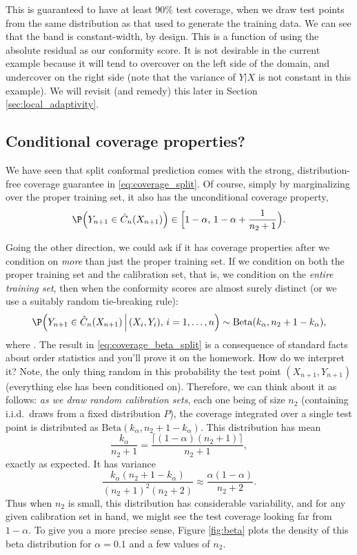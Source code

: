 \documentclass{article}
\begin{document}
This is guaranteed to have at least 90\% test coverage, when we draw test points
from the same distribution as that used to generate the training data. We can
see that the band is constant-width, by design. This is a function of using the
absolute residual as our conformity score. It is not desirable in the current
example because it will tend to overcover on the left side of the domain, and
undercover on the right side (note that the variance of $Y|X$ is not constant in
this example). We will revisit (and remedy) this later in Section
\ref{sec:local_adaptivity}.   

\subsection{Conditional coverage properties?}

We have seen that split conformal prediction comes with the strong,
distribution-free coverage guarantee in \eqref{eq:coverage_split}. Of course, 
simply by marginalizing over the proper training set, it also has the
unconditional coverage property, 
\[
\P\Big( Y_{n+1} \in \hC_n(X_{n+1}) \Big) \in
\Big[ 1-\alpha, \, 1-\alpha + \frac{1}{n_2+1} \Big).  
\]

Going the other direction, we could ask if it has coverage properties after we
condition on \emph{more} than just the proper training set. If we condition on
both the proper training set and the calibration set, that is, we condition on
the \emph{entire training set}, then when the conformity scores are almost 
surely distinct (or we use a suitably random tie-breaking rule): 
\begin{equation}
\label{eq:coverage_beta_split}
\P\Big(Y_{n+1} \in \hC_n(X_{n+1}) \, \Big| \, (X_i,Y_i), \, i=1,\dots,n \Big) 
\sim \mathrm{Beta}(k_\alpha, n_2+1-k_\alpha), 
\end{equation}
where . The result in
\eqref{eq:coverage_beta_split} is a consequence of standard facts about order
statistics and you'll prove it on the homework. How do we interpret it? Note,
the only thing random in this probability the test point $(X_{n+1},Y_{n+1})$
(everything else has been conditioned on). Therefore, we can think about it as
follows: \emph{as we draw random calibration sets}, each one being of size $n_2$ 
(containing i.i.d.\ draws from a fixed distribution $P$), the coverage
integrated over a single test point is distributed as $\mathrm{Beta}(k_\alpha,
n_2+1-k_\alpha)$. This distribution has mean   
\[
\frac{k_\alpha}{n_2+1} = \frac{\lceil (1-\alpha)(n_2+1) \rceil}{n_2+1},
\]
exactly as expected. It has variance
\[
\frac{k_\alpha (n_2+1-k_\alpha)}{(n_2+1)^2 (n_2+2)} \approx 
\frac{\alpha (1-\alpha)}{n_2+2}.
\]
Thus when $n_2$ is small, this distribution has considerable variability, and
for any given calibration set in hand, we might see the test coverage looking
far from $1-\alpha$. To give you a more precise sense, Figure \ref{fig:beta} 
plots the density of this beta distribution for $\alpha = 0.1$ and a few values 
of $n_2$.   
\end{document}
